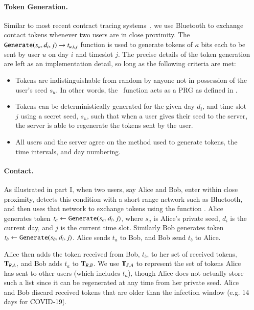 \paragraph{Token Generation.}

Similar to most recent contract tracing systems~\cite{cho2020contact,Covid-watch,CEN,chan2020pact}, we use Bluetooth to exchange contact tokens whenever two users are in close proximity. The $\texttt{Generate}(s_u, d_i, j) \rightarrow t_{u,i,j}$ function is used to generate tokens of $\kappa$ bits each to be sent by user $u$ on day $i$ and timeslot $j$. The precise details of the token generation are left as an implementation detail, so long as the following criteria are met:

\begin{itemize}
	\item Tokens are indistinguishable from random by anyone not in possession of the user's seed $s_u$. In other words, the \ctgenerate\ function acts as a PRG as defined in .
	
	\item Tokens can be deterministically generated for the given day $d_i$, and time slot $j$ using a secret seed, $s_u$, such that when a user gives their seed to the \dect server, the server is able to regenerate the tokens sent by the user.
	
	\item All users and the \dect server agree on the method used to generate tokens, the time intervals, and day numbering.
\end{itemize}

\paragraph{Contact.}

As illustrated in  part I, when two users, say Alice and Bob, enter within close proximity, \dect detects this condition with a short range network such as Bluetooth, and then uses that network to exchange tokens using the function \ctexchange. Alice generates token $t_a \gets \texttt{Generate}(s_a, d_i, j)$, where $s_a$ is Alice's private seed, $d_i$ is the current day, and $j$ is the current time slot. Similarly Bob generates token $t_b \gets \texttt{Generate}(s_b, d_i, j)$. Alice sends $t_a$ to Bob, and Bob send $t_b$ to Alice.

Alice then adds the token received from Bob, $t_b$, to her set of received tokens, $\mathbf{T}_{R,A}$, and Bob adds $t_a$ to $\mathbf{T}_{R,B}$. We use $\mathbf{T}_{S,A}$ to represent the set of tokens Alice has sent to other users (which includes $t_a$), though Alice does not actually store such a list since it can be regenerated at any time from her private seed. Alice and Bob discard received tokens that are older than the infection window (e.g. 14 days for COVID-19).

